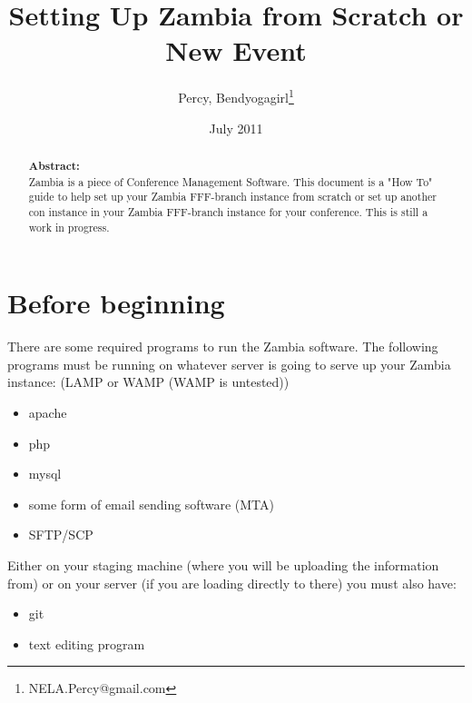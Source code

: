 \documentclass[captions=tablesignature]{scrartcl}
\author{Percy, Bendyogagirl\thanks{NELA.Percy@gmail.com}}
\date{July 2011}
\title{Setting Up Zambia from Scratch or New Event}
\begin{document}
\maketitle
{}
\thispagestyle{fancy}
\renewcommand{\headrulewidth}{0pt}
\renewcommand{\footrulewidth}{0pt}
\lhead{}
\rhead{}
\chead{}
\lfoot{}
\cfoot{}
\rfoot{}
\begin{abstract}
\vspace{5cm}
{\LARGE{\textbf{Abstract:\\}}}
Zambia is a piece of Conference Management Software.  This document is a "How To" guide to help set up your Zambia FFF-branch instance from scratch or set up another con instance in your Zambia FFF-branch instance for your conference.  This is still a work in progress.
\end{abstract}
\newpage
\renewcommand{\headrulewidth}{1pt}
\renewcommand{\footrulewidth}{1pt}
\rfoot{\thepage}
\setcounter{tocdepth}{3}
\tableofcontents
\listoftables
\listoffigures
\newpage
{}
\section{Before beginning}
\label{sec-1}

There are some required programs to run the Zambia software.  The
following programs must be running on whatever server is going to
serve up your Zambia instance: (LAMP or WAMP (WAMP is untested))
\begin{itemize}
\item apache
\item php
\item mysql
\item some form of email sending software (MTA)
\item SFTP/SCP
\end{itemize}

Either on your staging machine (where you will be uploading the
information from) or on your server (if you are loading directly to
there) you must also have:
\begin{itemize}
\item git
\item text editing program
\end{itemize}
\end{document}
